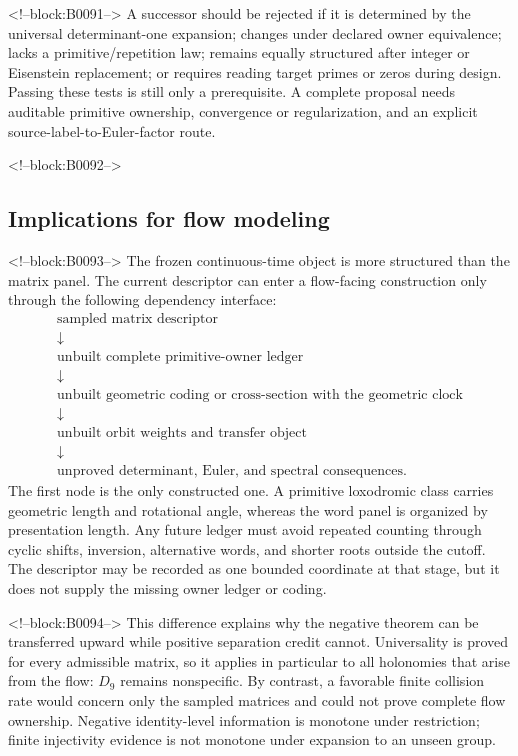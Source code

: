 \documentclass[11pt,a4paper]{article}
\theoremstyle{definition}
\theoremstyle{remark}
\begin{document}
<!--block:B0091-->
A successor should be rejected if it is determined by the universal determinant-one expansion; changes under declared owner equivalence; lacks a primitive/repetition law; remains equally structured after integer or Eisenstein replacement; or requires reading target primes or zeros during design. Passing these tests is still only a prerequisite. A complete proposal needs auditable primitive ownership, convergence or regularization, and an explicit source-label-to-Euler-factor route.

<!--block:B0092-->
\subsection{Implications for flow modeling}

<!--block:B0093-->
The frozen continuous-time object is more structured than the matrix panel. The current descriptor can enter a flow-facing construction only through the following dependency interface:
\[
\begin{array}{c}
 \text{sampled matrix descriptor}\\
 \downarrow\\
 \text{unbuilt complete primitive-owner ledger}\\
 \downarrow\\
 \text{unbuilt geometric coding or cross-section with the geometric clock}\\
 \downarrow\\
 \text{unbuilt orbit weights and transfer object}\\
 \downarrow\\
 \text{unproved determinant, Euler, and spectral consequences}.
\end{array}
\]
The first node is the only constructed one. A primitive loxodromic class carries geometric length and rotational angle, whereas the word panel is organized by presentation length. Any future ledger must avoid repeated counting through cyclic shifts, inversion, alternative words, and shorter roots outside the cutoff. The descriptor may be recorded as one bounded coordinate at that stage, but it does not supply the missing owner ledger or coding.

<!--block:B0094-->
This difference explains why the negative theorem can be transferred upward while positive separation credit cannot. Universality is proved for every admissible matrix, so it applies in particular to all holonomies that arise from the flow: \(D_9\) remains nonspecific. By contrast, a favorable finite collision rate would concern only the sampled matrices and could not prove complete flow ownership. Negative identity-level information is monotone under restriction; finite injectivity evidence is not monotone under expansion to an unseen group.
\end{document}

